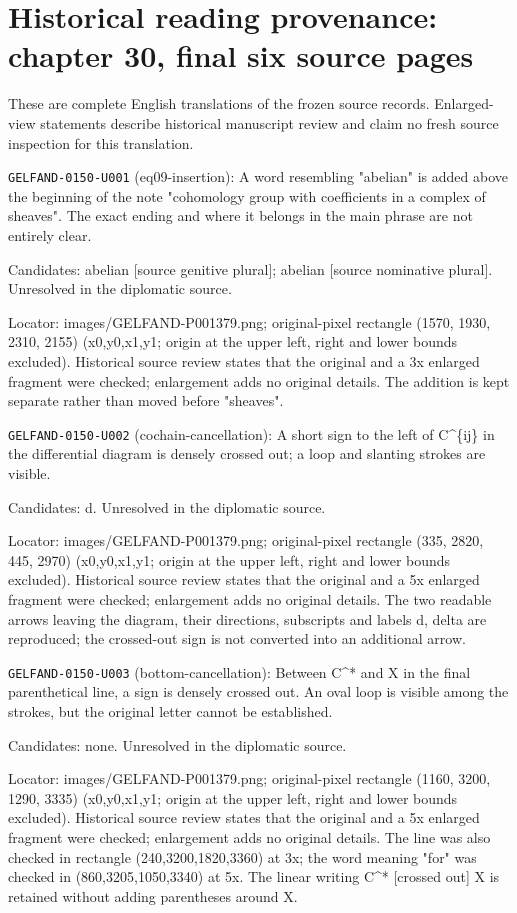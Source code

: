 \section*{Historical reading provenance: chapter 30, final six source pages}
These are complete English translations of the frozen source records. Enlarged-view statements describe historical manuscript review and claim no fresh source inspection for this translation.\par

\noindent\texttt{GELFAND-0150-U001} (eq09-insertion): A word resembling "abelian" is added above the beginning of the note "cohomology group with coefficients in a complex of sheaves". The exact ending and where it belongs in the main phrase are not entirely clear.\par
Candidates: abelian [source genitive plural]; abelian [source nominative plural]. Unresolved in the diplomatic source.\par
Locator: images/GELFAND-P001379.png; original-pixel rectangle (1570, 1930, 2310, 2155) (x0,y0,x1,y1; origin at the upper left, right and lower bounds excluded). Historical source review states that the original and a 3x enlarged fragment were checked; enlargement adds no original details. The addition is kept separate rather than moved before "sheaves".\par

\noindent\texttt{GELFAND-0150-U002} (cochain-cancellation): A short sign to the left of C\textasciicircum{}\{ij\} in the differential diagram is densely crossed out; a loop and slanting strokes are visible.\par
Candidates: d. Unresolved in the diplomatic source.\par
Locator: images/GELFAND-P001379.png; original-pixel rectangle (335, 2820, 445, 2970) (x0,y0,x1,y1; origin at the upper left, right and lower bounds excluded). Historical source review states that the original and a 5x enlarged fragment were checked; enlargement adds no original details. The two readable arrows leaving the diagram, their directions, subscripts and labels d, delta are reproduced; the crossed-out sign is not converted into an additional arrow.\par

\noindent\texttt{GELFAND-0150-U003} (bottom-cancellation): Between C\textasciicircum{}* and X in the final parenthetical line, a sign is densely crossed out. An oval loop is visible among the strokes, but the original letter cannot be established.\par
Candidates: none. Unresolved in the diplomatic source.\par
Locator: images/GELFAND-P001379.png; original-pixel rectangle (1160, 3200, 1290, 3335) (x0,y0,x1,y1; origin at the upper left, right and lower bounds excluded). Historical source review states that the original and a 5x enlarged fragment were checked; enlargement adds no original details. The line was also checked in rectangle (240,3200,1820,3360) at 3x; the word meaning "for" was checked in (860,3205,1050,3340) at 5x. The linear writing C\textasciicircum{}* [crossed out] X is retained without adding parentheses around X.\par

